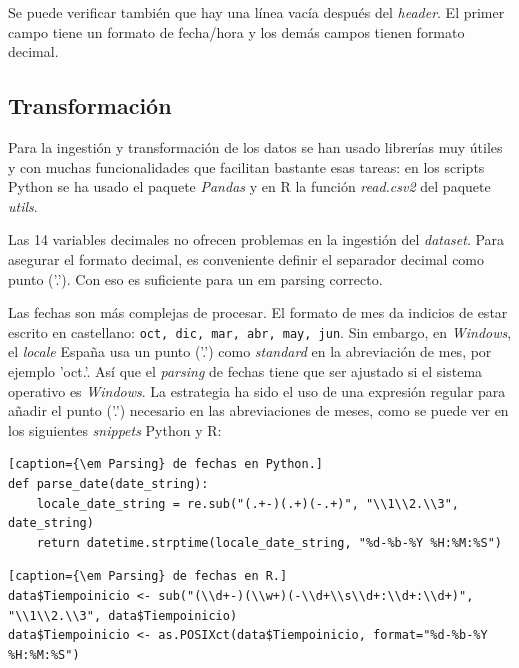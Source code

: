 \documentclass[11pt,spanish,listoffigures,listoftables]{tfgetsinf}
\begin{document}
        Se puede verificar también que hay una línea vacía después del {\em header}. El primer campo tiene un formato de fecha/hora y los demás campos tienen formato decimal.
    
        \subsection{Transformación}
        Para la ingestión y transformación de los datos se han usado librerías muy útiles y con muchas funcionalidades que facilitan bastante esas tareas: en los scripts Python se ha usado el paquete {\em Pandas} y en R la función {\em read.csv2} del paquete {\em utils}.
        
        Las 14 variables decimales no ofrecen problemas en la ingestión del {\em dataset}. Para asegurar el formato decimal, es conveniente definir el separador decimal como punto ('.'). Con eso es suficiente para un {em parsing} correcto.
        
        Las fechas son más complejas de procesar. El formato de mes da indicios de estar escrito en castellano: {\tt oct, dic, mar, abr, may, jun}. Sin embargo, en {\em Windows}, el {\em locale} España usa un punto ('.') como {\em standard} en la abreviación de mes, por ejemplo 'oct.'. Así que el {\em parsing} de fechas tiene que ser ajustado si el sistema operativo es {\em Windows}. La estrategia ha sido el uso de una expresión regular para añadir el punto ('.') necesario en las abreviaciones de meses, como se puede ver en los siguientes {\em snippets} Python y R:
        
        \lstset{style=python}
        \begin{lstlisting}[caption={\em Parsing} de fechas en Python.]
def parse_date(date_string):
    locale_date_string = re.sub("(.+-)(.+)(-.+)", "\\1\\2.\\3", date_string)
    return datetime.strptime(locale_date_string, "%d-%b-%Y %H:%M:%S")
        \end{lstlisting}
        
        \begin{lstlisting}[caption={\em Parsing} de fechas en R.]
data$Tiempoinicio <- sub("(\\d+-)(\\w+)(-\\d+\\s\\d+:\\d+:\\d+)", "\\1\\2.\\3", data$Tiempoinicio)
data$Tiempoinicio <- as.POSIXct(data$Tiempoinicio, format="%d-%b-%Y %H:%M:%S")
        \end{lstlisting}
        
\end{document}
